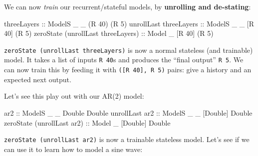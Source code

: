 \documentclass[]{article}
\newenvironment{Shaded}{}{}
\newcommand{\CommentTok}[1]{\textcolor[rgb]{0.38,0.63,0.69}{\textit{#1}}}
\newcommand{\DataTypeTok}[1]{\textcolor[rgb]{0.56,0.13,0.00}{#1}}
\newcommand{\DecValTok}[1]{\textcolor[rgb]{0.25,0.63,0.44}{#1}}
\newcommand{\FunctionTok}[1]{\textcolor[rgb]{0.02,0.16,0.49}{#1}}
\newcommand{\NormalTok}[1]{#1}
\newcommand{\OtherTok}[1]{\textcolor[rgb]{0.00,0.44,0.13}{#1}}
\begin{document}
We can now \emph{train} our recurrent/stateful models, by \textbf{unrolling and
de-stating}:

\begin{Shaded}
\begin{Highlighting}[]
\OtherTok{threeLayers                        ::} \DataTypeTok{ModelS}\NormalTok{ _ _ (}\DataTypeTok{R} \DecValTok{40}\NormalTok{) (}\DataTypeTok{R} \DecValTok{5}\NormalTok{)}
\NormalTok{unrollLast}\OtherTok{ threeLayers             ::} \DataTypeTok{ModelS}\NormalTok{ _ _ [}\DataTypeTok{R} \DecValTok{40}\NormalTok{] (}\DataTypeTok{R} \DecValTok{5}\NormalTok{)}
\NormalTok{zeroState (unrollLast threeLayers)}\OtherTok{ ::} \DataTypeTok{Model}\NormalTok{  _   [}\DataTypeTok{R} \DecValTok{40}\NormalTok{] (}\DataTypeTok{R} \DecValTok{5}\NormalTok{)}
\end{Highlighting}
\end{Shaded}

\texttt{zeroState\ (unrollLast\ threeLayers)} is now a normal stateless (and
trainable) model. It takes a list of inputs \texttt{R\ 40}s and produces the
``final output'' \texttt{R\ 5}. We can now train this by feeding it with
\texttt{({[}R\ 40{]},\ R\ 5)} pairs: give a history and an expected next output.

Let's see this play out with our AR(2) model:

\begin{Shaded}
\begin{Highlighting}[]
\OtherTok{ar2                        ::} \DataTypeTok{ModelS}\NormalTok{ _ _  }\DataTypeTok{Double}  \DataTypeTok{Double}
\NormalTok{unrollLast}\OtherTok{ ar2             ::} \DataTypeTok{ModelS}\NormalTok{ _ _ [}\DataTypeTok{Double}\NormalTok{] }\DataTypeTok{Double}
\NormalTok{zeroState (unrollLast ar2)}\OtherTok{ ::} \DataTypeTok{Model}\NormalTok{  _   [}\DataTypeTok{Double}\NormalTok{] }\DataTypeTok{Double}
\end{Highlighting}
\end{Shaded}

\texttt{zeroState\ (unrollLast\ ar2)} is now a trainable stateless model. Let's
see if we can use it to learn how to model a sine wave:

\begin{Shaded}
\end{Shaded}
\end{document}

